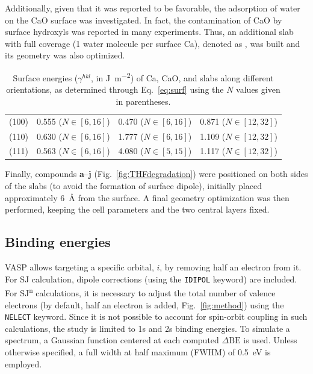 \documentclass[%
aip,
amsmath,amssymb,
preprint,%
jcp,
showkeys,
]{revtex4-2}
\def\dbe{\ensuremath{\Delta\text{BE}}}
\begin{document}
Additionally, given that it was reported to be favorable\cite{deleeuwDensityFunctionalTheory2000,fujimoriInteractionWaterCaO2016a}, the adsorption of water on the CaO surface was investigated. In fact, the contamination of CaO by surface hydroxyls was reported in many experiments\cite{dupinSystematicXPSStudies2000,bebenseeAdsorptionOxygenWater2008,fujimoriInteractionWaterCaO2016a,cristXPSLibraryWebsite2021a}. Thus, an additional slab with full coverage (1 water molecule per surface Ca), denoted as , was built and its geometry was also optimized. 

\begin{table}
	\caption{Surface energies ($\gamma^{hkl}$, in \si{\joule\per\meter\squared}) of Ca, CaO, and  slabs along different orientations, as determined through Eq.~\eqref{eq:surf} using the $N$ values given in parentheses.}
	\label{tab:surf}
	\begin{ruledtabular}
	\begin{tabular}{lccc}
		
		&	\ce{Ca^0} & \ce{CaO} &	\ce{CaH2} \\
		\hline
		(100) & 0.555 ($N\in[6,16]$) & 0.470 ($N\in[6,16]$) & 0.871  ($N\in[12,32]$)\\
		(110) & 0.630  ($N\in[6,16]$)& 1.777  ($N\in[6,16]$)& 1.109 ($N\in[12,32]$)\\
		(111) & 0.563  ($N\in[6,16]$) & 4.080  ($N\in[5,15]$)  & 1.117   ($N\in[12,32]$) \\ 
		
	\end{tabular}
\end{ruledtabular}
\end{table}

Finally, compounds \textbf{a}--\textbf{j} (Fig.~\ref{fig:THFdegradation}) were positioned on both sides of the slabs (to avoid the formation of surface dipole), initially placed approximately \SI{6}{\angstrom} from the surface. A final geometry optimization was then performed, keeping the cell parameters and the two central layers fixed.

\subsection{Binding energies} 

VASP allows targeting a specific orbital, $i$, by removing half an electron from it. For SJ calculation, dipole corrections (using the \texttt{IDIPOL} keyword) are included. For SJ\textsuperscript{n} calculations, it is necessary to adjust the total number of valence electrons (by default, half an electron is added, Fig.~\ref{fig:method}) using the \texttt{NELECT} keyword. Since it is not possible to account for spin-orbit coupling in such calculations, the study is limited to 1s and 2s binding energies. To simulate a spectrum, a Gaussian function centered at each computed \dbe{} is used. Unless otherwise specified, a full width at half maximum (FWHM) of \SI{0.5}{\electronvolt} is employed.
\end{document}
